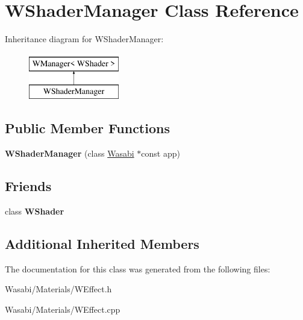 \hypertarget{class_w_shader_manager}{}\section{W\+Shader\+Manager Class Reference}
\label{class_w_shader_manager}
Inheritance diagram for W\+Shader\+Manager\+:\begin{figure}[H]
\begin{center}
\leavevmode
\includegraphics[height=2.000000cm]{class_w_shader_manager}
\end{center}
\end{figure}
\subsection*{Public Member Functions}
\begin{DoxyCompactItemize}
\item 
{\bfseries W\+Shader\+Manager} (class \hyperlink{class_wasabi}{Wasabi} $\ast$const app)\hypertarget{class_w_shader_manager_ada06146dd9fb0fbcf6e3d023004fdc66}{}\label{class_w_shader_manager_ada06146dd9fb0fbcf6e3d023004fdc66}

\end{DoxyCompactItemize}
\subsection*{Friends}
\begin{DoxyCompactItemize}
\item 
class {\bfseries W\+Shader}\hypertarget{class_w_shader_manager_a8d00ec6947471c8645472002a3d81cdc}{}\label{class_w_shader_manager_a8d00ec6947471c8645472002a3d81cdc}

\end{DoxyCompactItemize}
\subsection*{Additional Inherited Members}


The documentation for this class was generated from the following files\+:\begin{DoxyCompactItemize}
\item 
Wasabi/\+Materials/W\+Effect.\+h\item 
Wasabi/\+Materials/W\+Effect.\+cpp\end{DoxyCompactItemize}
